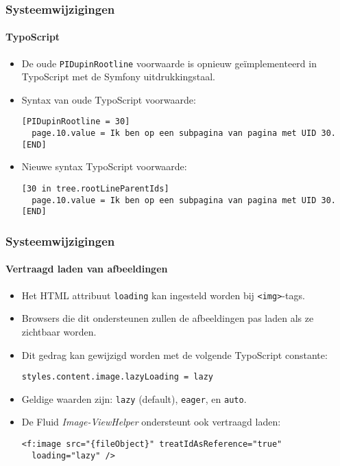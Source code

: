 \begin{frame}[fragile]
	\frametitle{Systeemwijzigingen}
	\framesubtitle{TypoScript}

	\lstset{basicstyle=\smaller\ttfamily}

	\begin{itemize}
		\item De oude \texttt{PIDupinRootline} voorwaarde is opnieuw geïmplementeerd
			in TypoScript met de Symfony uitdrukkingstaal.
		\item Syntax van oude TypoScript voorwaarde:
\begin{lstlisting}
[PIDupinRootline = 30]
  page.10.value = Ik ben op een subpagina van pagina met UID 30.
[END]
\end{lstlisting}

		\item Nieuwe syntax TypoScript voorwaarde:
\begin{lstlisting}
[30 in tree.rootLineParentIds]
  page.10.value = Ik ben op een subpagina van pagina met UID 30.
[END]
\end{lstlisting}

	\end{itemize}

\end{frame}


\begin{frame}[fragile]
	\frametitle{Systeemwijzigingen}
	\framesubtitle{Vertraagd laden van afbeeldingen}

	\lstset{basicstyle=\smaller\ttfamily}

	\begin{itemize}
		\item Het HTML attribuut \texttt{loading} kan ingesteld worden bij \texttt{<img>}-tags.
		\item Browsers die dit ondersteunen zullen de afbeeldingen pas laden als ze zichtbaar worden.
		\item Dit gedrag kan gewijzigd worden met de volgende TypoScript constante:
\begin{lstlisting}
styles.content.image.lazyLoading = lazy
\end{lstlisting}

		\item Geldige waarden zijn: \texttt{lazy} (default), \texttt{eager}, en \texttt{auto}.
		\item De Fluid \textit{Image-ViewHelper} ondersteunt ook vertraagd laden:
\begin{lstlisting}
<f:image src="{fileObject}" treatIdAsReference="true"
  loading="lazy" />
\end{lstlisting}

	\end{itemize}

\end{frame}

